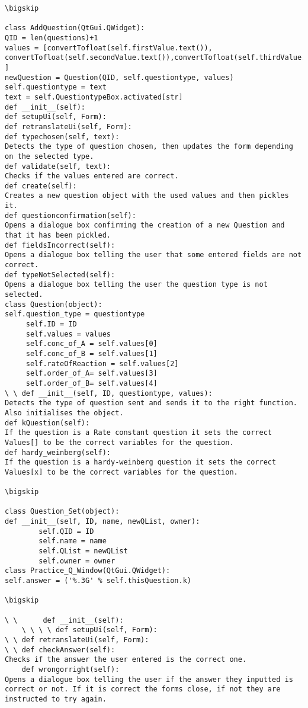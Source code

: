 \documentclass{article}
\begin{document}
\begin{verbatim}
\bigskip

class AddQuestion(QtGui.QWidget):
QID = len(questions)+1
values = [convertTofloat(self.firstValue.text()), convertTofloat(self.secondValue.text()),convertTofloat(self.thirdValue.text()),convertTofloat(self.FourthValue.text()),convertTofloat(self.FifthValue.text()) ]
newQuestion = Question(QID, self.questiontype, values)
self.questiontype = text
text = self.QuestiontypeBox.activated[str]
def __init__(self):
def setupUi(self, Form):
def retranslateUi(self, Form):
def typechosen(self, text):
Detects the type of question chosen, then updates the form depending on the selected type.
def validate(self, text):
Checks if the values entered are correct.
def create(self):
Creates a new question object with the used values and then pickles it.
def questionconfirmation(self):
Opens a dialogue box confirming the creation of a new Question and that it has been pickled.
def fieldsIncorrect(self):
Opens a dialogue box telling the user that some entered fields are not correct.
def typeNotSelected(self):
Opens a dialogue box telling the user the question type is not selected.
class Question(object):
self.question_type = questiontype
     self.ID = ID
     self.values = values
     self.conc_of_A = self.values[0]
     self.conc_of_B = self.values[1]
     self.rateOfReaction = self.values[2]
     self.order_of_A= self.values[3]
     self.order_of_B= self.values[4]
\ \ def __init__(self, ID, questiontype, values):
Detects the type of question sent and sends it to the right function. Also initialises the object.
def kQuestion(self):
If the question is a Rate constant question it sets the correct Values[] to be the correct variables for the question.
def hardy_weinberg(self):
If the question is a hardy-weinberg question it sets the correct Values[x] to be the correct variables for the question.

\bigskip

class Question_Set(object):
def __init__(self, ID, name, newQList, owner):
        self.QID = ID
        self.name = name
        self.QList = newQList
        self.owner = owner
class Practice_Q_Window(QtGui.QWidget):
self.answer = ('%.3G' % self.thisQuestion.k)

\bigskip

\ \      def __init__(self):
    \ \ \ \ def setupUi(self, Form):
\ \ def retranslateUi(self, Form):
\ \ def checkAnswer(self):
Checks if the answer the user entered is the correct one.
    def wrongorright(self):
Opens a dialogue box telling the user if the answer they inputted is correct or not. If it is correct the forms close, if not they are instructed to try again.


\end{verbatim}
\end{document}
